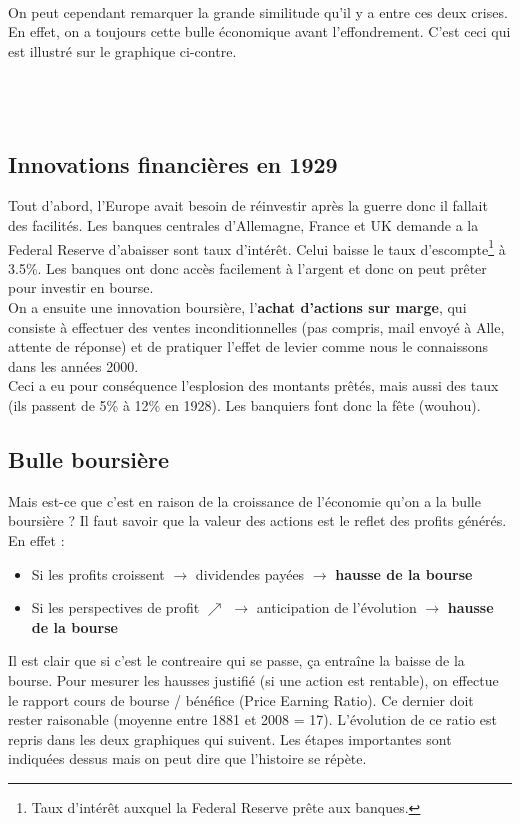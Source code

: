 \ \\ On peut cependant remarquer la grande similitude qu'il y a entre ces deux crises. En effet, on a toujours cette bulle économique avant l'effondrement. C'est ceci qui est illustré sur le graphique ci-contre. \\\\\\\\

\subsection{Innovations financières en 1929}
Tout d'abord, l'Europe avait besoin de réinvestir après la guerre donc il fallait des facilités. Les banques centrales d'Allemagne, France et UK demande a la Federal Reserve d'abaisser sont taux d'intérêt. Celui baisse le taux d'escompte\footnote{Taux d'intérêt auxquel la Federal Reserve prête aux banques.} à 3.5\%. Les banques ont donc accès facilement à l'argent et donc on peut prêter pour investir en bourse. \\
On a ensuite une innovation boursière, l'\textbf{achat d'actions sur marge}, qui consiste à effectuer des ventes inconditionnelles (pas compris, mail envoyé à Alle, attente de réponse) et de pratiquer l'effet de levier comme nous le connaissons dans les années 2000. \\
Ceci a eu pour conséquence l'esplosion des montants prêtés, mais aussi des taux (ils passent de 5\% à 12\% en 1928). Les banquiers font donc la fête (wouhou). 

\subsection{Bulle boursière}
Mais est-ce que c'est en raison de la croissance de l'économie qu'on a la bulle boursière ? Il faut savoir que la valeur des actions est le reflet des profits générés. En effet :

\begin{itemize}
	\item Si les profits croissent $\rightarrow$ dividendes payées $\rightarrow$ \textbf{hausse de la bourse}
	
	\item Si les perspectives de profit $\nearrow$ $\rightarrow$ anticipation de l'évolution $\rightarrow$ \textbf{hausse de la bourse}
\end{itemize}

Il est clair que si c'est le contreaire qui se passe, ça entraîne la baisse de la bourse. Pour mesurer les hausses justifié (si une action est rentable), on effectue le rapport cours de bourse / bénéfice (Price Earning Ratio). Ce dernier doit rester raisonable (moyenne entre 1881 et 2008 = 17). L'évolution de ce ratio est repris dans les deux graphiques qui suivent. Les étapes importantes sont indiquées dessus mais on peut dire que l'histoire se répète. \\

